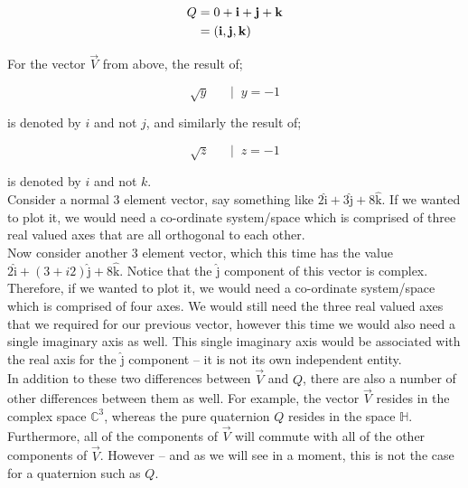 \begin{align*}
    Q & = 0 + \bm{\mathrm{i}} + \bm{\mathrm{j}} + \bm{\mathrm{k}}  \\
      &= (\bm{\mathrm{i}}, \bm{\mathrm{j}}, \bm{\mathrm{k}})
\end{align*}
\vspace{0.0\baselineskip}

For the vector \(\vec{V}\) from above, the result of;

\begin{equation*}
    \sqrt{y} \;\;\;\;\;\; | \;\; y=-1
\end{equation*}
\vspace{0.0\baselineskip}

is denoted by \(i\) and not \(j\), and similarly the result of;

\begin{equation*}
    \sqrt{z} \;\;\;\;\;\; | \;\; z=-1
\end{equation*}
\vspace{0.0\baselineskip}

is denoted by \(i\) and not \(k\).  \\

Consider a normal 3 element vector, say something like \(2 \bm{\hat{\mathrm{i}}} + 3 \bm{\hat{\mathrm{j}}} +
8 \bm{\hat{\mathrm{k}}}\). If we wanted to plot it, we would need a co-ordinate system/space which is comprised of
three real valued axes that are all orthogonal to each other. \\

Now consider another 3 element vector, which this time has the value \(2 \bm{\hat{\mathrm{i}}} + (3 + i2) \bm{\hat{\mathrm{j}}} +
8 \bm{\hat{\mathrm{k}}}\). Notice that the \(\bm{\hat{\mathrm{j}}}\) component of this vector is complex. Therefore, if
we wanted to plot it, we would need a co-ordinate system/space which is comprised of four axes. We would still need
the three real valued axes that we required for our previous vector, however this time we would also need a single
imaginary axis as well. This single imaginary axis would be associated with the real axis for the \(\bm{\hat{\mathrm{j}}}\)
component -- it is not its own independent entity. \\

In addition to these two differences between \(\vec{V}\) and \(Q\), there are also a number of other differences between
them as well. For example, the vector \(\vec{V}\) resides in the complex space \(\mathbb{C}^3\), whereas the pure
quaternion \(Q\) resides in the space \(\mathbb{H}\). Furthermore, all of the components of \(\vec{V}\) will commute
with all of the other components of \(\vec{V}\). However -- and as we will see in a moment, this is not the case for a
quaternion such as \(Q\).


